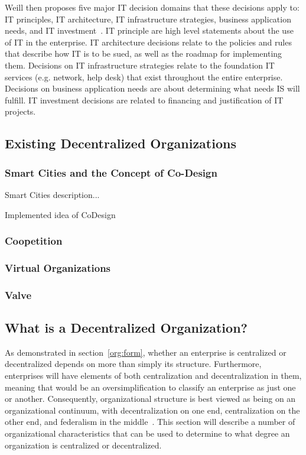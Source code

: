 Weill then proposes five major IT decision domains that these decisions apply to: IT principles, IT architecture, IT infrastructure strategies, business application needs, and IT investment~\cite{Weill2004}. IT principle are high level statements about the use of IT in the enterprise. IT architecture decisions relate to the policies and rules that describe how IT is to be sued, as well as the roadmap for implementing them. Decisions on IT infrastructure strategies relate to the foundation IT services (e.g. network, help desk) that exist throughout the entire enterprise.  Decisions on business application needs are about determining what needs IS will fulfill. IT investment decisions are related to financing and justification of IT projects.




\subsection{Existing Decentralized Organizations}

\subsubsection{Smart Cities and the Concept of Co-Design}
Smart Cities description...

Implemented idea of CoDesign

\subsubsection{Coopetition}

\subsubsection{Virtual Organizations}

\subsubsection{Valve}

\subsection{What is a Decentralized Organization?}

As demonstrated in section~\ref{org:form}, whether an enterprise is centralized or decentralized depends on more than simply its structure. Furthermore, enterprises will have elements of both centralization and decentralization in them, meaning that would be an oversimplification to classify an enterprise as just one or another. Consequently, organizational structure is best viewed as being on an organizational continuum, with decentralization on one end, centralization on the other end, and federalism in the middle~\cite{pearlson2009}. This section will describe a number of organizational characteristics that can be used to determine to what degree an organization is centralized or decentralized. 

